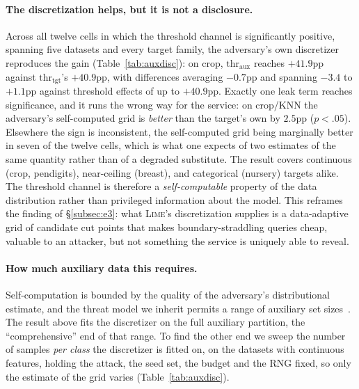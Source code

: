 \documentclass[sigconf,anonymous,review]{acmart}
\begin{document}
\paragraph{The discretization helps, but it is not a disclosure.} Across all twelve cells in which the
threshold channel is significantly positive, spanning five datasets and every target family, the adversary's own discretizer reproduces the gain (Table~\ref{tab:auxdisc}): on crop,
$\text{thr}_{\text{aux}}$ reaches $+41.9$pp against $\text{thr}_{\text{tgt}}$'s $+40.9$pp, with
differences averaging $-0.7$pp and spanning $-3.4$ to $+1.1$pp against threshold effects of up to
$+40.9$pp. Exactly one leak term reaches significance, and it runs the wrong way for the service:
on crop/KNN the adversary's self-computed grid is \emph{better} than the target's own by $2.5$pp
($p{<}.05$). Elsewhere the sign is inconsistent, the self-computed grid being marginally better in
seven of the twelve cells, which is what one expects of two estimates of the same quantity rather
than of a degraded substitute.
The result covers continuous (crop, pendigits), near-ceiling (breast), and categorical (nursery) targets alike. The threshold channel is therefore a
\emph{self-computable} property of the data distribution rather than privileged information about the
model. This reframes the finding of \S\ref{subsec:e3}: what \textsc{Lime}'s discretization supplies is
a data-adaptive grid of candidate cut points that makes boundary-straddling queries cheap, valuable to an attacker, but not something the service is uniquely able to reveal.

\paragraph{How much auxiliary data this requires.} Self-computation is bounded by the quality of the
adversary's distributional estimate, and the threat model we inherit permits a range of auxiliary set
sizes~\cite{oksuz2024autolycus}. The result above fits the discretizer on the full auxiliary
partition, the ``comprehensive'' end of that range. To find the other end we sweep the number of
samples \emph{per class} the discretizer is fitted on, on the datasets with continuous features,
holding the attack, the seed set, the budget and the RNG fixed, so only the estimate of the grid
varies (Table~\ref{tab:auxdisc}).
\end{document}
